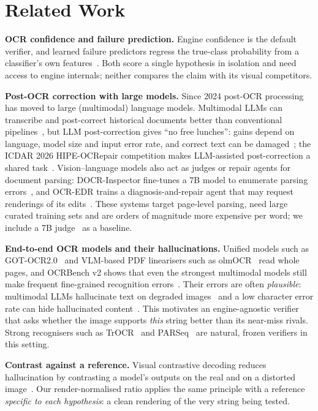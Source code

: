 \section{Related Work}
\label{sec:related}
\textbf{OCR confidence and failure prediction.} Engine confidence is the default verifier, and learned failure
predictors regress the true-class probability from a classifier's own features~\cite{corbiere2019confidnet}. Both
score a single hypothesis in isolation and need access to engine internals; neither compares the claim with its
visual competitors.

\textbf{Post-OCR correction with large models.} Since 2024 post-OCR processing has moved to large (multimodal)
language models. Multimodal LLMs can transcribe and post-correct historical documents better than conventional
pipelines~\cite{greif2025multimodal}, but LLM post-correction gives ``no free lunches'': gains depend on language,
model size and input error rate, and correct text can be damaged~\cite{kanerva2025nofree}; the ICDAR 2026
HIPE-OCRepair competition makes LLM-assisted post-correction a shared task~\cite{ehrmann2026hipe}. Vision--language
models also act as judges or repair agents for document parsing: DOCR-Inspector fine-tunes a 7B model to enumerate
parsing errors~\cite{zhang2025docrinspector}, and OCR-EDR trains a diagnosis-and-repair agent that may request
renderings of its edits~\cite{ocredr2026}. These systems target page-level parsing, need large curated training sets
and are orders of magnitude more expensive per word; we include a 7B judge~\cite{bai2025qwen25vl} as a baseline.

\textbf{End-to-end OCR models and their hallucinations.} Unified models such as GOT-OCR2.0~\cite{wei2024got} and
VLM-based PDF linearisers such as olmOCR~\cite{poznanski2025olmocr} read whole pages, and OCRBench v2 shows that even
the strongest multimodal models still make frequent fine-grained recognition errors~\cite{fu2025ocrbenchv2}. Their
errors are often \emph{plausible}: multimodal LLMs hallucinate text on degraded images~\cite{he2025seeing} and a low
character error rate can hide hallucinated content~\cite{gardella2026lowcer}. This motivates an engine-agnostic verifier that
asks whether the image supports \emph{this} string better than its near-miss rivals. Strong recognisers such as
TrOCR~\cite{li2023trocr} and PARSeq~\cite{bautista2022parseq} are natural, frozen verifiers in this setting.

\textbf{Contrast against a reference.} Visual contrastive decoding reduces hallucination by contrasting a model's
outputs on the real and on a distorted image~\cite{leng2024vcd}. Our render-normalised ratio applies the same
principle with a reference \emph{specific to each hypothesis}: a clean rendering of the very string being tested.

